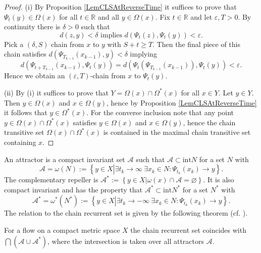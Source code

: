\documentclass{siamltex}%
\begin{document}
\begin{proof}
(i) By Proposition \ref{LemCLSAtReverseTime} it suffices to prove that
$\Psi_{t}(y)\in\Omega(x)$ for all $t\in\mathbb{R}$ and all $y\in\Omega(x)$.
Fix $t\in\mathbb{R}$ and let $\varepsilon,T>0$. By continuity there is
$\delta>0$ such that
\[
d(z,y)<\delta\text{ implies }d\left(  \Psi_{t}(z),\Psi_{t}(y)\right)
<\varepsilon.
\]
Pick a $(\delta,S)$ chain from $x$ to $y$ with $S+t\geq T$. Then the final
piece of this chain satisfies $d\left(  \Psi_{T_{k-1}}(x_{k-1}),y\right)
<\delta$ implying
\[
d\left(  \Psi_{t+T_{k-1}}(x_{k-1}),\Psi_{t}(y)\right)  =d\left(  \Psi_{t}%
(\Psi_{T_{k-1}}(x_{k-1})),\Psi_{t}(y)\right)  <\varepsilon.
\]
Hence we obtain an $(\varepsilon,T)$-chain from $x$ to $\Psi_{t}(y)$.

(ii) By (i) it suffices to prove that $Y=\Omega(x)\cap\Omega^{\ast}(x)$ for
all $x\in Y$. Let $y\in Y$. Then $y\in\Omega(x)$ and $x\in\Omega(y)$, hence by
Proposition \ref{LemCLSAtReverseTime} it follows that $y\in\Omega^{\ast}(x)$.
For the converse inclusion note that any point $y\in\Omega(x)\cap\Omega^{\ast
}(x)$ satisfies $y\in\Omega(x)$ and $x\in\Omega(y)$, hence the chain
transitive set $\Omega(x)\cap\Omega^{\ast}(x)$ is contained in the maximal
chain transitive set containing $x$.
\end{proof}

An attractor is a compact invariant set $\mathcal{A}$ such that $\mathcal{A}%
\subset\mathrm{int}N$ for a set $N$ with%
\begin{equation}
\mathcal{A}=\omega(N):=\left\{  y\in X\left\vert \exists t_{k}\rightarrow
\infty~\exists x_{k}\in N:\Psi_{t_{k}}(x_{k})\rightarrow y\right.  \right\}  .
\label{A}%
\end{equation}
The complementary repeller is $\mathcal{A}^{\ast}:=\left\{  y\in X\left\vert
\omega(x)\cap\mathcal{A}=\varnothing\right.  \right\}  $. It is also compact
invariant and has the property that $\mathcal{A}^{\ast}\subset\mathrm{int}%
N^{\ast}$ for a set $N^{\ast}$ with%
\begin{equation}
\mathcal{A}^{\ast}=\omega^{\ast}(N^{\ast}):=\left\{  y\in X\left\vert \exists
t_{k}\rightarrow-\infty~\exists x_{k}\in N:\Psi_{t_{k}}(x_{k})\rightarrow
y\right.  \right\}  . \label{repeller}%
\end{equation}
The relation to the chain recurrent set is given by the following theorem (cf.
\cite[Theorem B.2.26]{ColK00}).

\begin{theorem}
\label{Theorem_attractor}For a flow on a compact metric space $X$ the chain
recurrent set coincides with $\bigcap\left(  \mathcal{A}\cup\mathcal{A}^{\ast
}\right)  $, where the intersection is taken over all attractors $\mathcal{A}$.
\end{theorem}
\end{document}
